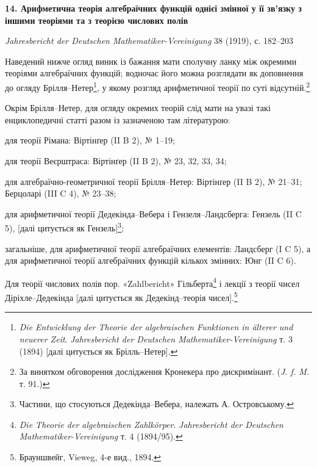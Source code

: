 \documentclass[11pt]{article}
\begin{document}

\begin{center}
{\Large\bfseries 14. Арифметична теорія алгебраїчних функцій однієї змінної у її зв'язку з іншими теоріями та з теорією числових полів\par}
\vspace{1.5em}
\emph{Jahresbericht der Deutschen Mathematiker-Vereinigung} 38 (1919), с. 182--203
\end{center}

Наведений нижче огляд виник із бажання мати сполучну ланку між окремими теоріями алгебраїчних функцій; водночас його можна розглядати як доповнення до огляду Брілля--Нетер\footnote{\emph{Die Entwicklung der Theorie der algebraischen Funktionen in älterer und neuerer Zeit}. \emph{Jahresbericht der Deutschen Mathematiker-Vereinigung} т. 3 (1894) [далі цитується як Брілль--Нетер].}, у якому розгляд арифметичної теорії по суті відсутній.\footnote{За винятком обговорення дослідження Кронекера про дискримінант. (\emph{J. f. M.} т. 91.)}

Окрім Брілля--Нетер, для огляду окремих теорій слід мати на увазі такі енциклопедичні статті разом із зазначеною там літературою:

для теорії Рімана: Віртінґер (II B 2), № 1--19;

для теорії Веєрштраса: Віртінґер (II B 2), № 23, 32, 33, 34;

для алгебраїчно-геометричної теорії Брілля--Нетер: Віртінґер (II B 2), № 21--31; Берцоларі (III C 4), № 23--38;

для арифметичної теорії Дедекінда--Вебера і Гензеля--Ландсберга: Гензель (II C 5), [далі цитується як Гензель]\footnote{Частини, що стосуються Дедекінда--Вебера, належать А. Островському.};

загальніше, для арифметичної теорії алгебраїчних елементів: Ландсберг (I C 5), а для арифметичної теорії алгебраїчних функцій кількох змінних: Юнг (II C 6).

Для теорії числових полів пор. «Zahlbericht» Гільберта\footnote{\emph{Die Theorie der algebraischen Zahlkörper}. \emph{Jahresbericht der Deutschen Mathematiker-Vereinigung} т. 4 (1894/95).} і лекції з теорії чисел Діріхле--Дедекінда [далі цитується як Дедекінд--теорія чисел].\footnote{Брауншвейг, Vieweg, 4-е вид., 1894.}
\end{document}
